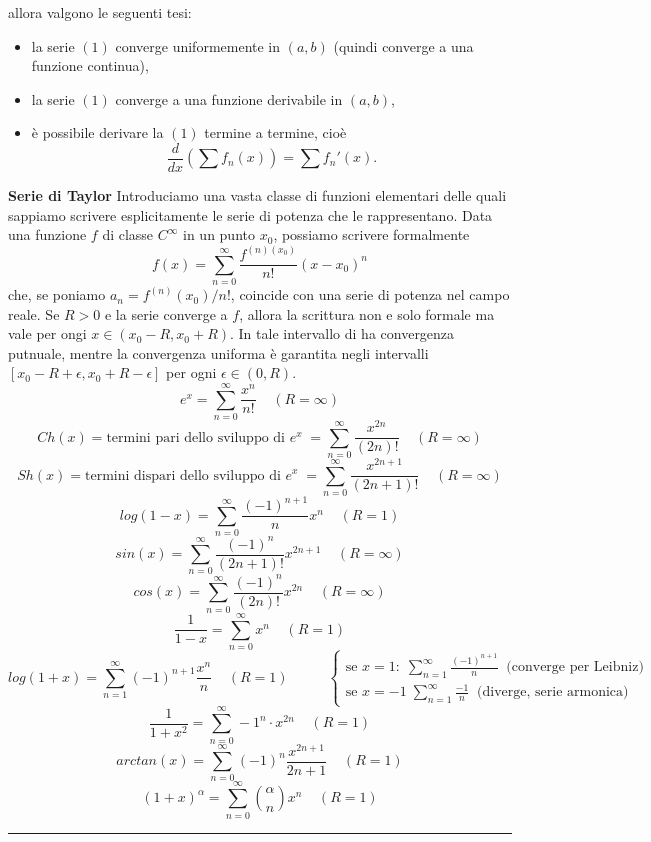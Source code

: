 allora valgono le seguenti tesi:
\begin{itemize}
    \item la serie $(1)$ converge uniformemente in $(a,b)$ (quindi converge a una funzione continua),
    \item la serie $(1)$ converge a una funzione derivabile in $(a,b)$,
    \item è possibile derivare la $(1)$ termine a termine, cioè
    \[
        \frac{d}{dx}\left(\sum f_n(x)\right) = \sum f_n'(x).
    \]
\end{itemize}
\textbf{Serie di Taylor}\newline
Introduciamo una vasta classe di funzioni elementari delle quali sappiamo scrivere esplicitamente le serie di potenza che le rappresentano.\newline
Data una funzione $f$ di classe $C^\infty$ in un punto $x_0$, possiamo scrivere formalmente
\[
    f(x) = \sum_{n=0}^{\infty} \frac{f^{(n)(x_0)}}{n!}(x-x_0)^n
\]
che, se poniamo $a_n = f^{(n)}(x_0)/n!$, coincide con una serie di potenza nel campo reale. Se $R > 0$ e la serie converge a $f$, allora la scrittura non e solo formale ma vale per ongi $x \in (x_0 - R, x_0 + R)$. In tale intervallo di ha convergenza putnuale, mentre la convergenza uniforma è garantita negli intervalli $[x_0 - R + \epsilon, x_0 + R -\epsilon]$ per ogni $\epsilon \in (0,R)$.
\[
    e^x = \sum_{n=0}^{\infty} \frac{x^n}{n!} \;\;\;\; (R= \infty)
\]
\[
    Ch(x) = \text{termini pari dello sviluppo di $e^x$}\;= \sum_{n=0}^{\infty} \frac{x^{2n}}{(2n)!} \;\;\;\; (R= \infty)
\]
\[
    Sh(x) = \text{termini dispari dello sviluppo di $e^x$}\;=  \sum_{n=0}^{\infty} \frac{x^{2n+1}}{(2n+1)!} \;\;\;\; (R= \infty)
\]
\[
    log(1-x) = \sum_{n=0}^{\infty} \frac{(-1)^{n+1}}{n} x^n\;\;\;\; (R=1)
\]
\[
    sin(x) = \sum_{n=0}^{\infty} \frac{(-1)^n}{(2n+1)!} x^{2n+1}\;\;\;\; (R= \infty)
\]
\[
    cos(x) = \sum_{n=0}^{\infty} \frac{(-1)^n}{(2n)!}x^{2n}\;\;\;\; (R= \infty)
\]
\[
    \frac{1}{1-x} = \sum_{n=0}^{\infty} x^n\;\;\;\; (R= 1)
\]
\[
    log(1+x) = \sum_{n=1}^{\infty} (-1)^{n+1} \frac{x^n}{n}\;\;\;\; (R= 1)\;\;\;\;\;\;\;\;\;\;\begin{cases}
        \text{se $x=1: $}\; \sum_{n=1}^{\infty}\frac{(-1)^{n+1}}{n} \;\;\text{(converge per Leibniz)}\;\\
        \text{se $x=-1$}\; \sum_{n=1}^{\infty}\frac{-1}{n} \;\;\text{(diverge, serie armonica)}\;
    \end{cases}
\]
\[
    \frac{1}{1+x^2} = \sum_{n=0}^{\infty} -1^n \cdot x^{2n} \;\;\;\;(R=1)
\]
\[
    arctan(x) = \sum_{n=0}^{\infty}(-1)^n \frac{x^{2n+1}}{2n+1} \;\;\;\;(R=1)
\]
\[
    (1+x)^\alpha = \sum_{n=0}^{\infty} \binom{\alpha}{n}x^n \;\;\;\; (R=1)
\]
\rule{\textwidth}{2pt}
